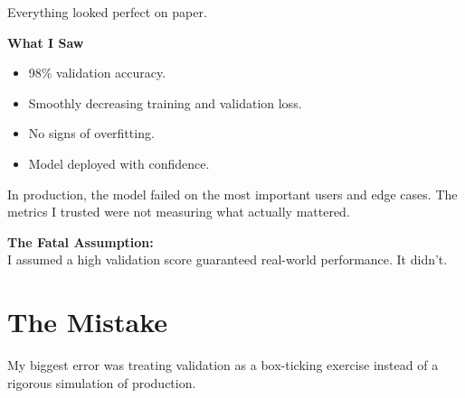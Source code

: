 \documentclass[11pt]{article}
\begin{document}
\vspace{0.3in}

{\large\color{brandgray}
Everything looked perfect on paper.
}

\vspace{0.15in}

\begin{darkbox}
{\large\textbf{What I Saw}}

\vspace{0.05in}
\begin{itemize}[leftmargin=*, itemsep=0.08in, label={\color{brandblue}\textbullet}]
    \item 98\% validation accuracy.
    \item Smoothly decreasing training and validation loss.
    \item No signs of overfitting.
    \item Model deployed with confidence.
\end{itemize}
\end{darkbox}

\vspace{0.2in}

In production, the model failed on the most important users and edge cases. The metrics I trusted were not measuring what actually mattered.

\vspace{0.15in}

\begin{infobox}
\textbf{The Fatal Assumption:}\\
I assumed a high validation score guaranteed real-world performance. It didn't.
\end{infobox}

\vfill
\newpage

\section*{The Mistake}

\vspace{0.15in}

My biggest error was treating validation as a box-ticking exercise instead of a rigorous simulation of production.

\vspace{0.2in}
\end{document}
